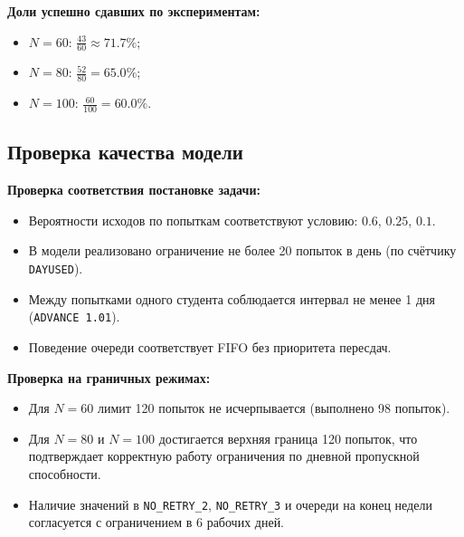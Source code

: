 \documentclass[a4paper, 14pt]{extarticle}
\begin{document}
\textbf{Доли успешно сдавших по экспериментам:}
\begin{itemize}
  \item $N=60$: $\frac{43}{60}\approx 71.7\%$;
  \item $N=80$: $\frac{52}{80}=65.0\%$;
  \item $N=100$: $\frac{60}{100}=60.0\%$.
\end{itemize}

\subsection{Проверка качества модели}
\textbf{Проверка соответствия постановке задачи:}
\begin{itemize}
  \item Вероятности исходов по попыткам соответствуют условию: $0.6$, $0.25$, $0.1$.
  \item В модели реализовано ограничение не более 20 попыток в день (по счётчику \texttt{DAYUSED}).
  \item Между попытками одного студента соблюдается интервал не менее 1 дня (\texttt{ADVANCE 1.01}).
  \item Поведение очереди соответствует FIFO без приоритета пересдач.
\end{itemize}

\textbf{Проверка на граничных режимах:}
\begin{itemize}
  \item Для $N=60$ лимит 120 попыток не исчерпывается (выполнено 98 попыток).
  \item Для $N=80$ и $N=100$ достигается верхняя граница 120 попыток, что подтверждает корректную работу ограничения по дневной пропускной способности.
  \item Наличие значений в \texttt{NO\_RETRY\_2}, \texttt{NO\_RETRY\_3} и очереди на конец недели согласуется с ограничением в 6 рабочих дней.
\end{itemize}
\end{document}

